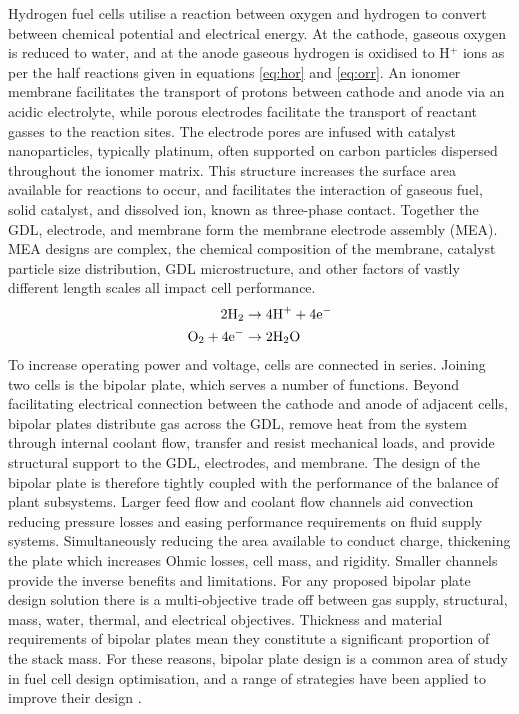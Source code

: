 Hydrogen fuel cells utilise a reaction between oxygen and hydrogen to convert between chemical potential and electrical energy.
At the cathode, gaseous oxygen is reduced to water, and at the anode gaseous hydrogen is oxidised to H$^+$ ions as per the half reactions given in equations \ref{eq:hor} and \ref{eq:orr}.
An ionomer membrane facilitates the transport of protons between cathode and anode via an acidic electrolyte, while porous electrodes facilitate the transport of reactant gasses to the reaction sites.
The electrode pores are infused with catalyst nanoparticles, typically platinum, often supported on carbon particles dispersed throughout the ionomer matrix.
This structure increases the surface area available for reactions to occur, and facilitates the interaction of gaseous fuel, solid catalyst, and dissolved ion, known as three-phase contact.
Together the GDL, electrode, and membrane form the membrane electrode assembly (MEA).
MEA designs are complex, the chemical composition of the membrane, catalyst particle size distribution, GDL microstructure, and other factors of vastly different length scales all impact cell performance.
\begin{align}
	2\text{H}_2             & \rightarrow 4 \text{H}^+ + 4 \text{e}^- \label{eq:hor} \\
	\text{O}_2 + 4\text{e}^- & \rightarrow 2\text{H}_2\text{O} \label{eq:orr}
\end{align}
To increase operating power and voltage, cells are connected in series.
Joining two cells is the bipolar plate, which serves a number of functions.
Beyond facilitating electrical connection between the cathode and anode of adjacent cells, bipolar plates distribute gas across the GDL, remove heat from the system through internal coolant flow, transfer and resist mechanical loads, and provide structural support to the GDL, electrodes, and membrane.
The design of the bipolar plate is therefore tightly coupled with the performance of the balance of plant subsystems.
Larger feed flow and coolant flow channels aid convection reducing pressure losses and easing performance requirements on fluid supply systems.
Simultaneously reducing the area available to conduct charge, thickening the plate which increases Ohmic losses, cell mass, and rigidity.
Smaller channels provide the inverse benefits and limitations.
For any proposed bipolar plate design solution there is a multi-objective trade off between gas supply, structural, mass, water, thermal, and electrical objectives.
Thickness and material requirements of bipolar plates mean they constitute a significant proportion of the stack mass.
For these reasons, bipolar plate design is a common area of study in fuel cell design optimisation, and a range of strategies have been applied to improve their design \cite{liReviewBipolarPlates2005}.

